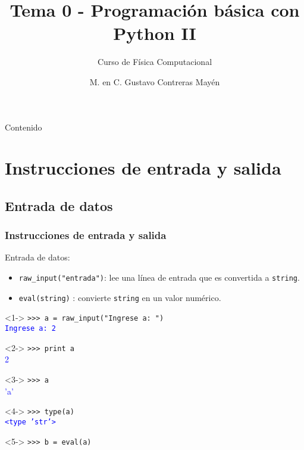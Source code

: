 \documentclass[12pt]{beamer}
\title{Tema 0 - Programaci\'{o}n b\'{a}sica con Python II}
\subtitle{Curso de F\'{i}sica Computacional}
\author{M. en C. Gustavo Contreras May\'{e}n}
\date{}
\begin{document}
\maketitle
\fontsize{14}{14}\selectfont
{}
\begin{frame}{Contenido}
\tableofcontents[pausesections]
\end{frame}
\section{Instrucciones de entrada y salida}
\subsection{Entrada de datos}
\begin{frame}[fragile]
\frametitle{Instrucciones de entrada y salida}
Entrada de datos:
\begin{itemize}
\item \verb|raw_input("entrada")|: lee una l\'{i}nea de entrada que es convertida a \texttt{string}.
\item \verb|eval(string)| : convierte \texttt{string} en un valor num\'{e}rico.
\end{itemize}
\fontsize{10}{10}\selectfont
\begin{minipage}{5.5cm}
\begin{exampleblock}{}<1->
	\verb|>>> a = raw_input("Ingrese a: ")| \\
	\pause
	\textcolor{blue}{\texttt{Ingrese a: 2}}
\end{exampleblock}
\begin{exampleblock}{}<2->
	\verb|>>> print a| \\
	\pause
	\textcolor{blue}{2}
\end{exampleblock}
\begin{exampleblock}{}<3->
	\verb|>>> a| \\
	\pause
	\textcolor{blue}{'a'}
\end{exampleblock}
\begin{exampleblock}{}<4->
	\verb|>>> type(a)| \\
	\pause
	\textcolor{blue}{\texttt{<type 'str'>}}
\end{exampleblock}
\end{minipage}
\hspace{0.5cm}
\begin{minipage}{5.5cm}
\begin{exampleblock}{}<5->
	\verb|>>> b = eval(a)|
\end{exampleblock}
\end{minipage}
\end{frame}
\end{document}
